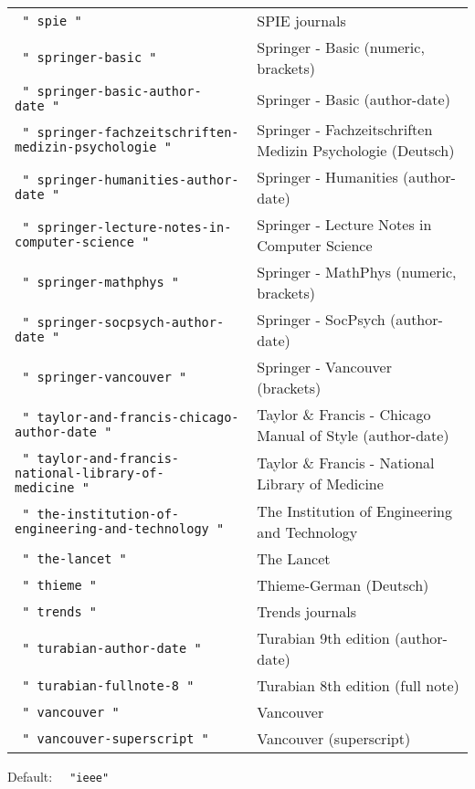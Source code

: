 \begin{longtable}[]{@{}ll@{}}
\texttt{\ "\ spie\ "\ } & SPIE journals \\
\texttt{\ "\ springer-basic\ "\ } & Springer - Basic (numeric,
brackets) \\
\texttt{\ "\ springer-basic-author-date\ "\ } & Springer - Basic
(author-date) \\
\texttt{\ "\ springer-fachzeitschriften-medizin-psychologie\ "\ } &
Springer - Fachzeitschriften Medizin Psychologie (Deutsch) \\
\texttt{\ "\ springer-humanities-author-date\ "\ } & Springer -
Humanities (author-date) \\
\texttt{\ "\ springer-lecture-notes-in-computer-science\ "\ } & Springer
- Lecture Notes in Computer Science \\
\texttt{\ "\ springer-mathphys\ "\ } & Springer - MathPhys (numeric,
brackets) \\
\texttt{\ "\ springer-socpsych-author-date\ "\ } & Springer - SocPsych
(author-date) \\
\texttt{\ "\ springer-vancouver\ "\ } & Springer - Vancouver
(brackets) \\
\texttt{\ "\ taylor-and-francis-chicago-author-date\ "\ } & Taylor \&
Francis - Chicago Manual of Style (author-date) \\
\texttt{\ "\ taylor-and-francis-national-library-of-medicine\ "\ } &
Taylor \& Francis - National Library of Medicine \\
\texttt{\ "\ the-institution-of-engineering-and-technology\ "\ } & The
Institution of Engineering and Technology \\
\texttt{\ "\ the-lancet\ "\ } & The Lancet \\
\texttt{\ "\ thieme\ "\ } & Thieme-German (Deutsch) \\
\texttt{\ "\ trends\ "\ } & Trends journals \\
\texttt{\ "\ turabian-author-date\ "\ } & Turabian 9th edition
(author-date) \\
\texttt{\ "\ turabian-fullnote-8\ "\ } & Turabian 8th edition (full
note) \\
\texttt{\ "\ vancouver\ "\ } & Vancouver \\
\texttt{\ "\ vancouver-superscript\ "\ } & Vancouver (superscript) \\
\end{longtable}

Default: \texttt{\ }{\texttt{\ "ieee"\ }}\texttt{\ }

\href{/docs/reference/model/}{\pandocbounded{}}


